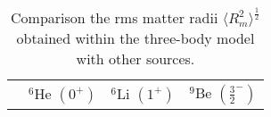 \documentclass[
12pt, %
oneside, %
english, %
onehalfspacing, %
onehalfspacing, %
headsepline, %
]{MastersDoctoralThesis} %
\begin{document}
\begin{table}[bp]
\caption{Comparison the rms matter radii $\langle R_m^2 \rangle^{\frac{1}{2}}$ obtained within the three-body model with other sources.}
\label{tab:rms_matter}
\begin{tabular*}{\textwidth}{@{\extracolsep{\fill}}lccc@{}}
\toprule
 & $^6$He                                                                                                                                                  $(0^+)$ & $^6$Li                                                                                                                                                                                                                                                                                                  $(1^+)$  & $^9$Be                                                                                                                                                                                                                                                                                                  $(\frac{3}{2}^-)$  \\

\end{tabular*}
\end{table}
\end{document}
